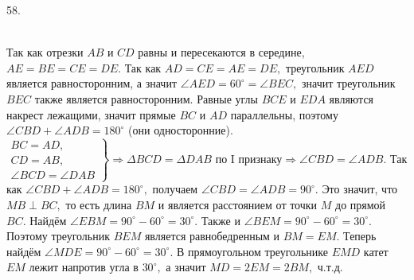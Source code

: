 58. \begin{figure}[ht!]
\end{figure}\\
Так как отрезки $AB$ и $CD$ равны и пересекаются в середине, $AE=BE=CE=DE.$ Так как $AD=CE=AE=DE,$ треугольник $AED$ является равносторонним, а значит $\angle AED=60^\circ=\angle BEC,$ значит треугольник $BEC$ также является равносторонним. Равные углы $BCE$ и $EDA$ являются накрест лежащими, значит прямые $BC$ и $AD$ параллельны, поэтому $\angle CBD+\angle ADB=180^\circ$ (они односторонние). $\left.\begin{array}{l}BC=AD,\\
CD=AB,\\
\angle BCD=\angle DAB  \end{array}\right\}\Rightarrow \Delta BCD=\Delta DAB\text{ по I признаку}\Rightarrow \angle CBD=\angle ADB.$ Так как $\angle CBD+\angle ADB=180^\circ,$ получаем $\angle CBD=\angle ADB=90^\circ.$ Это значит, что $MB\perp BC,$ то есть длина $BM$ и является расстоянием от точки $M$ до прямой $BC.$ Найдём $\angle EBM=90^\circ-60^\circ=30^\circ.$ Также и $\angle BEM=90^\circ-60^\circ=30^\circ.$ Поэтому треугольник $BEM$ является равнобедренным и $BM=EM.$ Теперь найдём $\angle MDE=90^\circ-60^\circ=30^\circ.$ В прямоугольном треугольнике $EMD$ катет $EM$ лежит напротив угла в $30^\circ,$ а значит $MD=2EM=2BM,$ ч.т.д.\\
